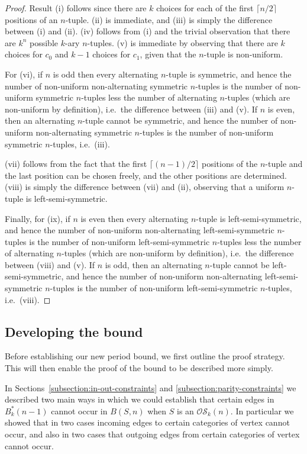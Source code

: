 \documentclass[a4paper,11pt]{article}
\begin{document}
\begin{proof}
Result (i) follows since there are $k$ choices for each of the first $\lceil n/2\rceil$ positions
of an $n$-tuple.  (ii) is immediate, and (iii) is simply the difference between (i) and (ii). (iv)
follows from (i) and the trivial observation that there are $k^n$ possible $k$-ary $n$-tuples. (v)
is immediate by observing that there are $k$ choices for $c_0$ and $k-1$ choices for $c_1$, given
that the $n$-tuple is non-uniform.

For (vi), if $n$ is odd then every alternating $n$-tuple is symmetric, and hence the number of
non-uniform non-alternating symmetric $n$-tuples is the number of non-uniform symmetric $n$-tuples
less the number of alternating $n$-tuples (which are non-uniform by definition), i.e.\ the
difference between (iii) and (v).  If $n$ is even, then an alternating $n$-tuple cannot be
symmetric, and hence the number of non-uniform non-alternating symmetric $n$-tuples is the number
of non-uniform symmetric $n$-tuples, i.e.\ (iii).

(vii) follows from the fact that the first $\lceil(n-1)/2\rceil$ positions of the $n$-tuple and the
last position can be chosen freely, and the other positions are determined. (viii) is simply the
difference between (vii) and (ii), observing that a uniform $n$-tuple is left-semi-symmetric.

Finally, for (ix), if $n$ is even then every alternating $n$-tuple is left-semi-symmetric, and
hence the number of non-uniform non-alternating left-semi-symmetric $n$-tuples is the number of
non-uniform left-semi-symmetric $n$-tuples less the number of alternating $n$-tuples (which are
non-uniform by definition), i.e.\ the difference between (viii) and (v).  If $n$ is odd, then an
alternating $n$-tuple cannot be left-semi-symmetric, and hence the number of non-uniform
non-alternating left-semi-symmetric $n$-tuples is the number of non-uniform left-semi-symmetric
$n$-tuples, i.e.\ (viii).
\end{proof}

\subsection{Developing the bound}

Before establishing our new period bound, we first outline the proof strategy.  This will then
enable the proof of the bound to be described more simply.

In Sections~\ref{subsection:in-out-constraints} and \ref{subsection:parity-constraints} we
described two main ways in which we could establish that certain edges in $B^*_k(n-1)$ cannot occur
in $B(S,n)$ when $S$ is an $\mathcal{OS}_k(n)$.  In particular we showed that in two cases incoming
edges to certain categories of vertex cannot occur, and also in two cases that outgoing edges from
certain categories of vertex cannot occur.
\end{document}

